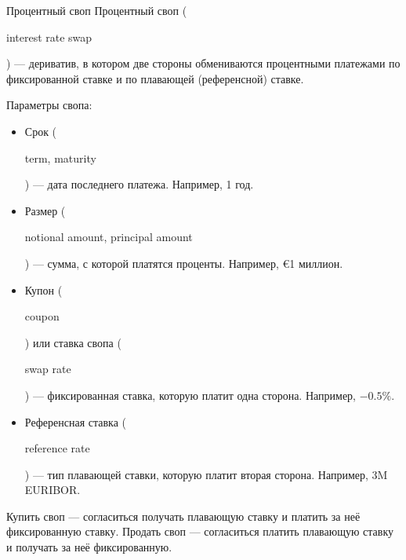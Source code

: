 \documentclass{beamer}
\renewcommand{\EUR}[1]{\textup{\euro}#1}
\newcommand{\en}[1]{\begin{otherlanguage}{english}#1\end{otherlanguage}}
\begin{document}
\begin{frame}{Процентный своп}
\justify
\alert{Процентный своп} (\en{interest rate swap}) --- дериватив, в котором две стороны 
обмениваются процентными платежами по фиксированной ставке и по плавающей (референсной) 
ставке. 

\justify
Параметры свопа:
\begin{itemize}
\justifying
\item Срок (\en{term, maturity}) --- дата последнего платежа. Например, 1 год.
\item Размер (\en{notional amount, principal amount}) --- сумма, с которой платятся проценты. Например, \EUR{1} миллион.
\item Купон (\en{coupon}) или ставка свопа (\en{swap rate}) --- фиксированная ставка, которую платит одна сторона. Например, $-0.5\%$.
\item Референсная ставка (\en{reference rate}) --- тип плавающей ставки, которую платит вторая сторона. Например, 3M EURIBOR.
\end{itemize}

\justify
Купить своп --- согласиться получать плавающую ставку и платить за неё фиксированную ставку. Продать своп --- согласиться платить плавающую ставку и получать за неё фиксированную.
\end{frame}
\end{document}
